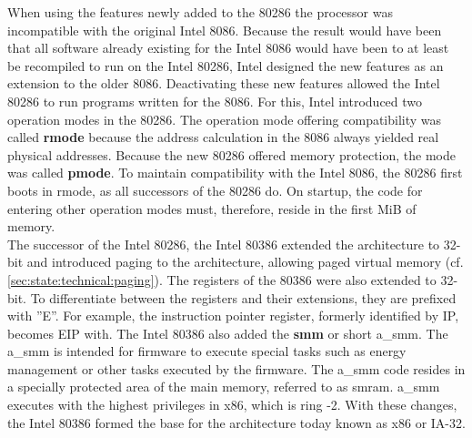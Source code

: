When using the features newly added to the 80286 the processor was incompatible
with the original Intel 8086. Because the result would have been that all
software already existing for the Intel 8086 would have been to at least be
recompiled to run on the Intel 80286, Intel designed the new features as an
extension to the older 8086. Deactivating these new features allowed the Intel
80286 to run programs written for the 8086. For this, Intel introduced two
operation modes in the 80286. The operation mode offering compatibility was
called \textbf{\gls{rmode}} because the address calculation in the 8086 always
yielded real physical addresses. Because the new 80286 offered memory
protection, the mode was called \textbf{\gls{pmode}}. To maintain compatibility
with the Intel 8086, the 80286 first boots in \gls{rmode}, as all successors of
the 80286 do. On startup, the code for entering other operation modes must,
therefore, reside in the first MiB of memory. \\

The successor of the Intel 80286, the Intel 80386 extended the architecture to
32-bit and introduced paging to the architecture, allowing paged virtual memory
(cf. \ref{sec:state:technical:paging}). The registers of the 80386 were also
extended to 32-bit. To differentiate between the registers and their extensions,
they are prefixed with ''E''. For example, the instruction pointer register,
formerly identified by IP, becomes EIP with. The Intel 80386 also added the
\textbf{\gls{smm}} or short \acrshort{a_smm}. The \acrshort{a_smm} is intended
for firmware to execute special tasks such as energy management or other tasks
executed by the firmware. The \acrshort{a_smm} code resides in a specially
protected area of the main memory, referred to as \gls{smram}. \acrshort{a_smm}
executes with the highest privileges in x86, which is ring -2. With these
changes, the Intel 80386 formed the base for the architecture today known as x86
or IA-32.\\

